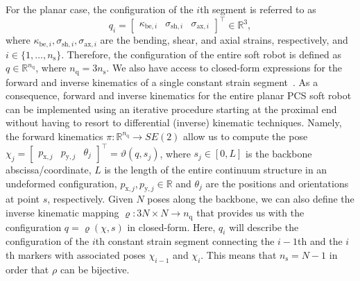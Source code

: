 For the planar case, the configuration of the $i$th segment is referred to as
\begin{equation}
    q_i= \begin{bmatrix}
    \kappa_{\mathrm{be},i} & \sigma_{\mathrm{sh},i} & \sigma_{\mathrm{ax},i}
\end{bmatrix}^\top \in \mathbb{R}^3,
\end{equation}
where $\kappa_{\mathrm{be},i}, \sigma_{\mathrm{sh},i}, \sigma_{\mathrm{ax},i}$ are the bending, shear, and axial strains, respectively, and $i \in \{1, \dots, n_\mathrm{s} \}$. 
Therefore, the configuration of the entire soft robot is defined as $q \in \mathbb{R}^{n_\mathrm{q}}$, where $n_\mathrm{q} = 3 n_\mathrm{s}$.
We also have access to closed-form expressions for the forward and inverse kinematics of a single constant strain segment~\cite{stolzle2024experimental}.
As a consequence, forward and inverse kinematics for the entire planar \gls{PCS} soft robot can be implemented using an iterative procedure starting at the proximal end without having to resort to differential (inverse) kinematic techniques.
Namely, the forward kinematics $\pi: \mathbb{R}^{n_\mathrm{q}} \to SE(2)$ allow us to compute the pose $\chi_j = \begin{bmatrix}
    p_{\mathrm{x},j} & p_{\mathrm{y},j} & \theta_j
\end{bmatrix}^\top = \vartheta(q,s_j)$, where $s_j \in [0, L]$ is the backbone abscissa/coordinate, $L$ is the length of the entire continuum structure in an undeformed configuration, $p_{\mathrm{x},j}, p_{\mathrm{y},j} \in \mathbb{R}$ and $\theta_j$ are the positions and orientations at point $s$, respectively.
Given $N$ poses along the backbone, we can also define the inverse kinematic mapping $\varrho: 3N \times N \to n_\mathrm{q}$ that provides us with the configuration $q = \varrho(\chi, s)$ in closed-form. Here, $q_i$ will describe the configuration of the $i$th constant strain segment connecting the $i-1$th and the $i$th markers with associated poses $\chi_{i-1}$ and $\chi_i$. This means that $n_\mathrm{s} = N -1$ in order that $\rho$ can be bijective.



